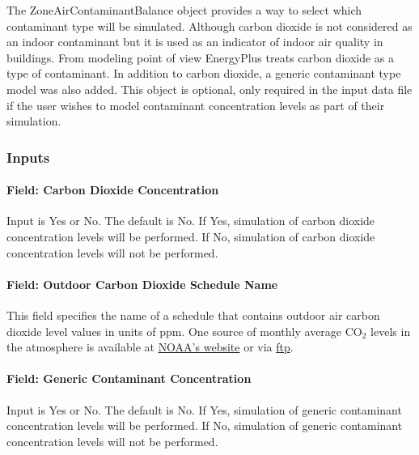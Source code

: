 The ZoneAirContaminantBalance object provides a way to select which contaminant type will be simulated. Although carbon dioxide is not considered as an indoor contaminant but it is used as an indicator of indoor air quality in buildings. From modeling point of view EnergyPlus treats carbon dioxide as a type of contaminant. In addition to carbon dioxide, a generic contaminant type model was also added. This object is optional, only required in the input data file if the user wishes to model contaminant concentration levels as part of their simulation.

\subsubsection{Inputs}\label{inputs-9-021}

\paragraph{Field: Carbon Dioxide Concentration}\label{field-carbon-dioxide-concentration}

Input is Yes or No. The default is No. If Yes, simulation of carbon dioxide concentration levels will be performed. If No, simulation of carbon dioxide concentration levels will not be performed.

\paragraph{Field: Outdoor Carbon Dioxide Schedule Name}\label{field-outdoor-carbon-dioxide-schedule-name}

This field specifies the name of a schedule that contains outdoor air carbon dioxide level values in units of ppm. One source of monthly average CO\(_{2}\) levels in the atmosphere is available at \href{http://www.esrl.noaa.gov/gmd/ccgg/trends/}{NOAA's website} or via \href{ftp://aftp.cmdl.noaa.gov/products/trends/co2/co2_mm_mlo.txt}{ftp}.

\paragraph{Field: Generic Contaminant Concentration}\label{field-generic-contaminant-concentration}

Input is Yes or No. The default is No. If Yes, simulation of generic contaminant concentration levels will be performed. If No, simulation of generic contaminant concentration levels will not be performed.

